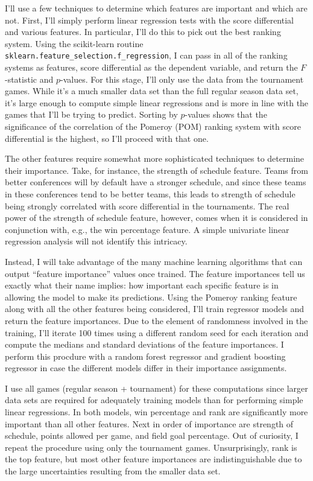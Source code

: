 \documentclass[twocolumn]{aastex63}
\begin{document}
I'll use a few techniques to determine which features are important and which are not.
First, I'll simply perform linear regression tests with the score differential and various features.
In particular, I'll do this to pick out the best ranking system.
Using the {\sc scikit-learn} routine \texttt{sklearn.feature\_selection.f\_regression}, I can pass in all of the ranking systems as features, score differential as the dependent variable, and return the $F$-statistic and $p$-values.
For this stage, I'll only use the data from the tournament games.
While it's a much smaller data set than the full regular season data set, it's large enough to compute simple linear regressions and is more in line with the games that I'll be trying to predict.
Sorting by $p$-values shows that the significance of the correlation of the Pomeroy (POM) ranking system with score differential is the highest, so I'll proceed with that one.

The other features require somewhat more sophisticated techniques to determine their importance.
Take, for instance, the strength of schedule feature.
Teams from better conferences will by default have a stronger schedule, and since these teams in these conferences tend to be better teams, this leads to strength of schedule being strongly correlated with score differential in the tournaments.
The real power of the strength of schedule feature, however, comes when it is considered in conjunction with, e.g., the win percentage feature.
A simple univariate linear regression analysis will not identify this intricacy.

Instead, I will take advantage of the many machine learning algorithms that can output ``feature importance'' values once trained.
The feature importances tell us exactly what their name implies: how important each specific feature is in allowing the model to make its predictions.
Using the Pomeroy ranking feature along with all the other features being considered, I'll train regressor models and return the feature importances.
Due to the element of randomness involved in the training, I'll iterate 100 times using a different random seed for each iteration and compute the medians and standard deviations of the feature importances.
I perform this procdure with a random forest regressor and gradient boosting regressor in case the different models differ in their importance assignments.

I use all games (regular season + tournament) for these computations since larger data sets are required for adequately training models than for performing simple linear regressions.
In both models, win percentage and rank are significantly more important than all other features. 
Next in order of importance are strength of schedule, points allowed per game, and field goal percentage.
Out of curiosity, I repeat the procedure using only the tournament games.
Unsurprisingly, rank is the top feature, but most other feature importances are indistinguishable due to the large uncertainties resulting from the smaller data set.
\end{document}
